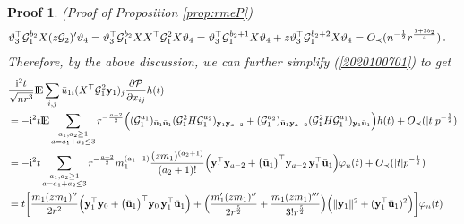\documentclass[12pt]{article}
\numberwithin{equation}{section}
\newtheorem{myPro}{Proof}
\theoremstyle{remark}
\newcommand{\1}{{\rm 1}\kern-0.24em{\rm I}}
\newcommand{\E}{{\rm I}\kern-0.18em{\rm E}}
\begin{document}
\begin{appendices}
\begin{myPro}{(Proof of Proposition  \ref{prop:rmeP})}
\begin{align*}
&{\bf {\vartheta}}_3^{\top} \mathcal{G}_1^{b_2}{X} (z\mathcal{G}_2)' {\bf {\vartheta}}_4 = {\bf {\vartheta}}_3^{\top} \mathcal{G}_1^{b_2}{X}{X}^{\top} \mathcal{G}_1^2 {X} {\bf {\vartheta}}_4 = {\bf {\vartheta}}_3^{\top} \mathcal{G}_1^{b_2+1} {X} {\bf {\vartheta}}_4  +  z{\bf {\vartheta}}_3^{\top} \mathcal{G}_1^{b_2+2} {X} {\bf {\vartheta}}_4 = O_\prec(n^{-\frac 12} r^{\frac{1+2b_2}{4}})\,.
 \end{align*} 
 Therefore, by the above discussion, we can further simplify (\ref{2020100701}) to get 
 {\small 
 \begin{align} \label{2020100703}
 & \frac{\mathrm{i}^2 t}{\sqrt {nr^3}}\E\sum_{i,j} \bar{u}_{1i}  ({X}^{\top}\mathcal{G}_1^2{\bf y}_1)_j \frac{\partial \mathcal{P}}{\partial x_{ij}}  h(t)\notag\\
&=- \mathrm{i}^2 t \E \sum_{\begin{subarray}{c} a_1, a_2\geq 1\\ a=a_1+a_2\leq 3\end{subarray}} 
 r^{-\frac{a+2}{2}}\Big((\mathcal{G}_1^{a_1})_{\bar{\bf u}_1 \bar{\bf u}_1}(\mathcal{G}_1^2{H}\mathcal{G}_1^{a_2})_{{\bf y}_1{\bf y}_{a-2}} + (\mathcal{G}_1^{a_2})_{\bar{\bf u}_1 {\bf y}_{a-2}}(\mathcal{G}_1^2{H}\mathcal{G}_1^{a_1})_{{\bf y}_1\bar{\bf u}_1 }\Big)h(t)+ O_\prec(|t|p^{-\frac 12}) \notag\\
&= - \mathrm{i}^2 t \sum_{\begin{subarray}{c} a_1, a_2\geq 1\\ a=a_1+a_2\leq 3\end{subarray}}  
 r^{-\frac{a+2}{2}}m_1^{(a_1-1)}\frac{(zm_1)^{(a_2+1)}}{(a_2+1)!}\Big( {\bf y}_1^{\top}{\bf y}_{a-2} + \big(\bar{\bf u}_1\big)^{\top} {\bf y}_{a-2} \,{\bf y}_1^{\top}\bar{\bf u}_1 \Big)\varphi_n(t)+ O_\prec(|t|p^{-\frac 12}) \notag\\
&=  t \bigg[ \frac{m_1(zm_1)''}{2r^2} \Big( {\bf y}_1^{\top}{\bf y}_{0} + \big(\bar{\bf u}_1\big)^{\top} {\bf y}_{0} \,{\bf y}_1^{\top}\bar{\bf u}_1 \Big) + \Big( \frac{m_1'(zm_1)''}{2r^{\frac 52}} + \frac{m_1(zm_1)'''}{3!r^{\frac 52}}\Big)\Big(\Vert{\bf y}_{1} \Vert^2+ ({\bf y}_1^{\top}\bar{\bf u}_1)^2 \Big) \bigg]\varphi_n(t)\notag\\

\end{align}}
\end{myPro}
\end{appendices}
\end{document}
